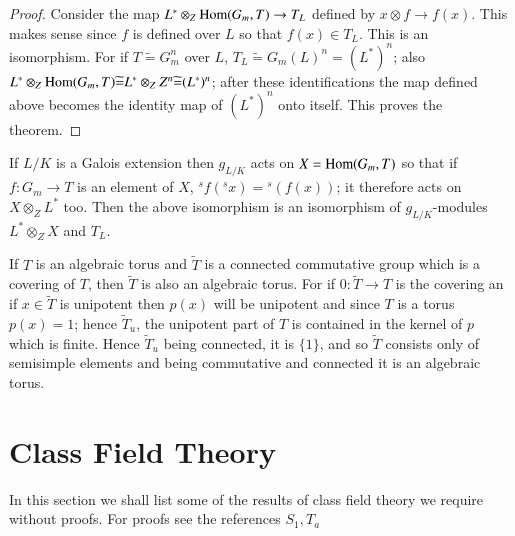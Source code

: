 \begin{proof}
Consider the map $L^* \otimes_Z \operatorname{Hom} ( G_m,T)\rightarrow T_L$
defined by  $x \otimes f \rightarrow f(x)$. This makes sense since $f$
is defined over $L$ so that $f(x) \in T_L$. This is an
isomorphism. For if $T\widetilde{=} G_m^n$ over  $L$, $T_L \widetilde{=}
G_m (L)^n = (L^*)^n $; also $L^\ast \otimes_Z \operatorname{Hom} (G_m,T)\widetilde{=}L^*
\otimes_Z  Z^n \widetilde{=} (L^*)^n$; after these identifications the
map defined above becomes the identity map of $(L^*)^n$ onto
itself. This proves the theorem. 
\end{proof}

\begin{remark*}
If $L/K$ is a Galois extension then $g_{L/K}$ acts on $X = \Hom
(G_m,\break T)$ so that if $f: G_m \rightarrow T$ is an element of $X$,
$^sf(^sx)= {}^s (f(x))$; it therefore acts on $X \otimes_Z L^*$
too. Then the above isomorphism is an isomorphism of $g_{L/K}$-modules
$L^* \otimes_Z X$ and $T_L$. 
\end{remark*}

If $T$ is an algebraic torus and  $\widetilde{T}$ is a connected
commutative group which is a covering of $T$, then $\widetilde{T}$ is
also an algebraic torus. For if $0:\widetilde{T} \rightarrow T$ is the
covering an if $x \in \widetilde{T}$ is unipotent then $p(x)$ will be
unipotent and since $T$ is a torus $p(x)=1$; hence $\widetilde{T}_u$,
the unipotent part of $T$ is contained in the kernel of $p$ which  is
finite. Hence $\widetilde{T}_u$ being connected, it is $\{1\}$, and so
$\widetilde{T}$ consists only of semisimple elements and being
commutative and connected it is an algebraic torus. 


\section{Class Field Theory}\label{chap3:sec3.2} 

In this section we shall list some of the results of class field
theory we require without proofs. For proofs see the references $S_1,
T_a$ 

\medskip
{}\pageoriginale

